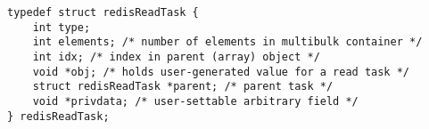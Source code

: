 \documentclass[a4paper,10pt]{article}
\begin{document}
\begin{CJK*}{UTF8}{gkai}
\begin{verbatim}
typedef struct redisReadTask {
    int type;
    int elements; /* number of elements in multibulk container */
    int idx; /* index in parent (array) object */
    void *obj; /* holds user-generated value for a read task */
    struct redisReadTask *parent; /* parent task */
    void *privdata; /* user-settable arbitrary field */
} redisReadTask;



\end{verbatim}


\end{CJK*}
\end{document}
